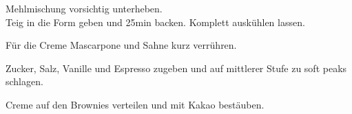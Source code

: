\begin{recipe}
{    \step%
    Mehlmischung vorsichtig unterheben.\\
    
    \step%
    Teig in die Form geben und 25min backen. Komplett auskühlen lassen.
    
    \step%
    Für die Creme Mascarpone und Sahne kurz verrühren.
    
    \step%
    Zucker, Salz, Vanille und Espresso zugeben und auf mittlerer Stufe zu soft peaks schlagen.
    
    \step%
    Creme auf den Brownies verteilen und mit Kakao bestäuben.
}




\end{recipe}